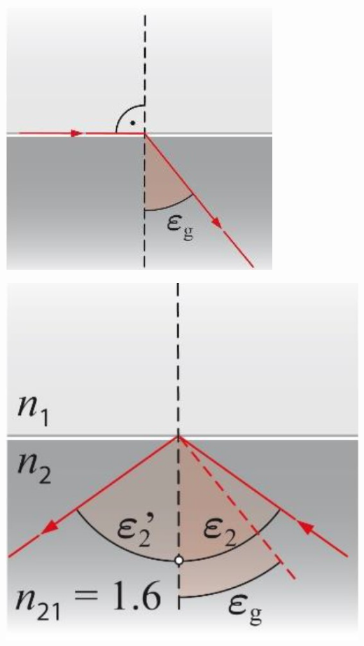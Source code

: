 \begin{minipage}{0.35\linewidth}
\includegraphics[width=\linewidth]{Bilder/Wellen-Optik/totalreflexion} 
\end{minipage}
\hfill
\begin{minipage}{0.35\linewidth}
\includegraphics[width=\linewidth]{Bilder/Wellen-Optik/totalreflexion_2} 
\end{minipage}

